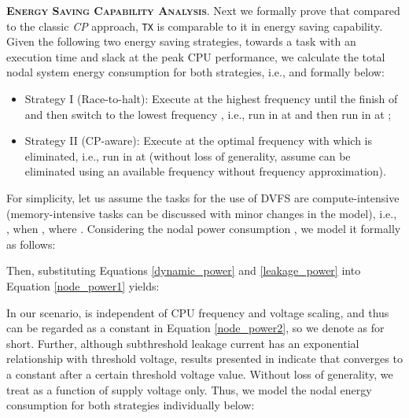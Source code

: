 \documentclass[12pt]{elsarticle}
\begin{document}
\vspace{1mm}
\noindent\textsc{\textbf{Energy Saving Capability Analysis}}. Next we formally prove that compared to the classic \emph{CP} approach, \texttt{TX} is comparable to it in energy saving capability. Given the following two energy saving strategies, towards a task  with an execution time  and slack  at the peak CPU performance, we calculate the total nodal system energy consumption for both strategies, i.e.,  and  formally below:

\begin{itemize}
\item \textsf{Strategy I (Race-to-halt)}: Execute  at the highest frequency  until the finish of  and then switch to the lowest frequency , i.e., run in  at  and then run in  at ;\item \textsf{Strategy II (CP-aware)}: Execute  at the optimal frequency  with which  is eliminated, i.e., run in  at  (without loss of generality, assume  can be eliminated using an available frequency  without frequency approximation).\end{itemize}

For simplicity, let us assume the tasks for the use of DVFS are compute-intensive (memory-intensive tasks can be discussed with minor changes in the model), i.e., , when , where . Considering the nodal power consumption , we model it formally as follows:

\vspace{-3mm}


\vspace{-5.5mm}


\vspace{-5.5mm}


Then, substituting Equations \ref{dynamic_power} and \ref{leakage_power} into Equation \ref{node_power1} yields:

\vspace{-3mm}


In our scenario,  is independent of CPU frequency and voltage scaling, and thus can be regarded as a constant in Equation \ref{node_power2}, so we denote  as  for short. Further, although subthreshold leakage current  has an exponential relationship with threshold voltage, results presented in \cite{edl04} indicate that  converges to a constant after a certain threshold voltage value. Without loss of generality, we treat  as a function of supply voltage  only. Thus, we model the nodal energy consumption  for both strategies individually below:

\vspace{-3mm}
\end{document}
